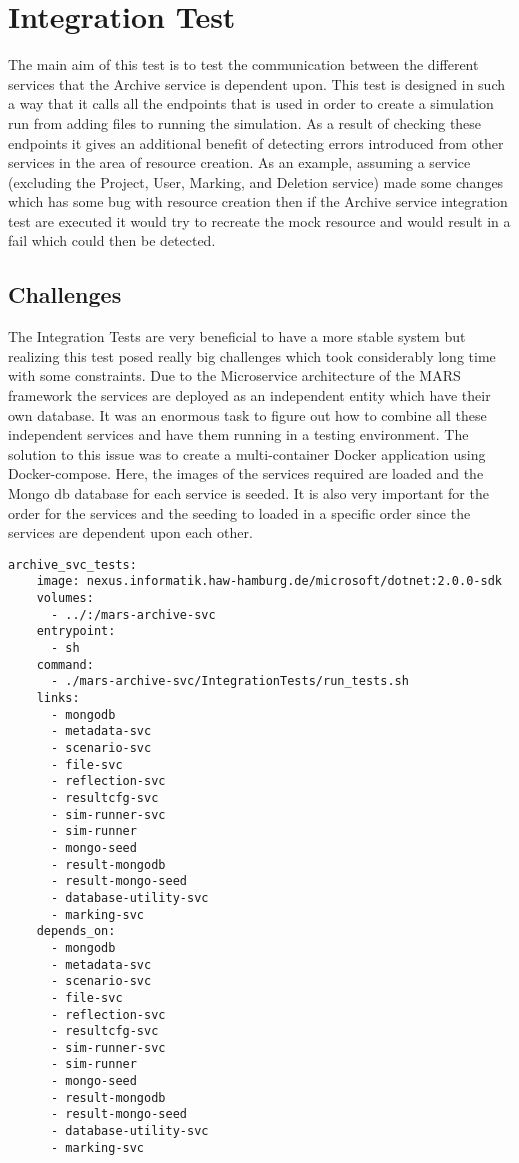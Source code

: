 \section{Integration Test}
The main aim of this test is to test the communication between the different services that the Archive service is dependent upon. This test is designed in 
such a way that it calls all the endpoints that is used in order to create a simulation run from adding files to running the simulation. As a result of checking
these endpoints it gives an additional benefit of detecting errors introduced from other services in the area of resource creation. As an example, assuming a service
(excluding the Project, User, Marking, and Deletion service)
made some changes which has some bug with resource creation then if the Archive service integration test are executed it would try to recreate the mock resource
and would result in a fail which could then be detected.

\subsection{Challenges}
The Integration Tests are very beneficial to have a more stable system but realizing this test posed really big challenges which took considerably long time with
some constraints. Due to the Microservice architecture of the MARS framework the services are deployed as an independent entity which have their own database.
It was an enormous task to figure out how to combine all these independent services and have them running in a testing environment. The solution to this issue
was to create a multi-container Docker application using Docker-compose. Here, the images of the services required are loaded and the Mongo db database for each
service is seeded. It is also very important for the order for the services and the seeding to loaded in a specific order since the services are dependent upon
each other.  

\begin{lstlisting}[language=docker-compose,caption={Docker compose configuration snippet for Archive service Integration Test}, captionpos=b, breaklines=true,label={code:integCompose}]
archive_svc_tests:
    image: nexus.informatik.haw-hamburg.de/microsoft/dotnet:2.0.0-sdk
    volumes:
      - ../:/mars-archive-svc
    entrypoint:
      - sh
    command:
      - ./mars-archive-svc/IntegrationTests/run_tests.sh
    links:
      - mongodb
      - metadata-svc
      - scenario-svc
      - file-svc
      - reflection-svc
      - resultcfg-svc
      - sim-runner-svc
      - sim-runner
      - mongo-seed
      - result-mongodb
      - result-mongo-seed
      - database-utility-svc
      - marking-svc
    depends_on:
      - mongodb
      - metadata-svc
      - scenario-svc
      - file-svc
      - reflection-svc
      - resultcfg-svc
      - sim-runner-svc
      - sim-runner
      - mongo-seed
      - result-mongodb
      - result-mongo-seed
      - database-utility-svc
      - marking-svc
\end{lstlisting}      

